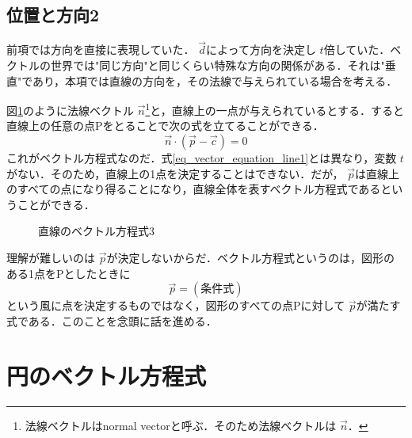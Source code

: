 \documentclass[dvipdfmx]{jsarticle}
\begin{document}
    \subsection{位置と方向2}
    前項では方向を直接に表現していた． \(\vec{d}\)によって方向を決定し \(t\)倍していた．ベクトルの世界では"同じ方向"と同じくらい特殊な方向の関係がある．それは"垂直"であり，本項では直線の方向を，その法線で与えられている場合を考える．

    図\ref{tikz_vector_equation_line2}のように法線ベクトル \(\vec{n}\)\footnote{法線ベクトルはnormal vectorと呼ぶ．そのため法線ベクトルは \(\vec{n}\)．}と，直線上の一点が与えられているとする．すると直線上の任意の点Pをとることで次の式を立てることができる．
    \begin{equation}
        \vec{n}\cdot(\vec{p}-\vec{c})=0
        \label{eq_vector_equation_line2}
    \end{equation}
    これがベクトル方程式なのだ．式\eqref{eq_vector_equation_line1}とは異なり，変数 \(t\)がない．そのため，直線上の1点を決定することはできない．だが， \(\vec{p}\)は直線上のすべての点になり得ることになり，直線全体を表すベクトル方程式であるということができる．

    \begin{figure}[htbp]\centering
        \caption{直線のベクトル方程式3}
        \label{tikz_vector_equation_line2}
    \end{figure}

    理解が難しいのは \(\vec{p}\)が決定しないからだ．ベクトル方程式というのは，図形のある1点をPとしたときに
    \[
    \vec{p}=(\text{条件式})
    \]
    という風に点を決定するものではなく，図形のすべての点Pに対して \(\vec{p}\)が満たす式である．このことを念頭に話を進める．

    \section{円のベクトル方程式}
\end{document}
